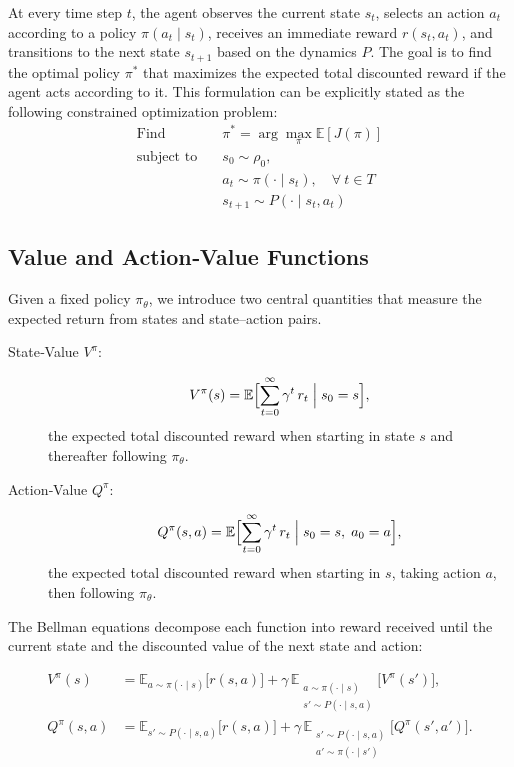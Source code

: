 At every time step \(t\), the agent observes the current state \(s_t\), selects an action \(a_t\) according to a policy \(\pi(a_t\mid s_t)\), receives an immediate reward \(r(s_t,a_t)\), and transitions to the next state \(s_{t+1}\) based on the dynamics \(P\). The goal is to find the optimal policy \(\pi^*\) that maximizes the expected total discounted reward if the agent acts according to it. This formulation can be explicitly stated as the following constrained optimization problem:
\begin{equation}\label{eq:RL_opt}
\begin{aligned}
\text{Find} \quad & \pi^* = \arg\max_{\pi} \mathbb{E}\left[J(\pi)\right] \\
\text{subject to} \quad & s_0 \sim \rho_0, \\
& a_t \sim \pi(\cdot \mid s_t), \quad \forall\ t \in T \\
& s_{t+1} \sim P(\cdot \mid s_t, a_t)
\end{aligned}
\end{equation}

\subsection{Value and Action‐Value Functions}

Given a fixed policy \(\pi_\theta\), we introduce two central quantities that measure the expected return from states and state–action pairs.

\begin{description}
  \item[State‐Value \(V^\pi\):]
    \[
      V^\pi(s)
      = \mathbb{E}\Bigl[\sum_{t=0}^{\infty}\gamma^t\,r_t
      \;\Big|\;s_0 = s\Bigr],
    \]
    the expected total discounted reward when starting in state \(s\) and thereafter following \(\pi_\theta\).
  
  \item[Action‐Value \(Q^\pi\):]
    \[
      Q^\pi(s,a)
      = \mathbb{E}\Bigl[\sum_{t=0}^{\infty}\gamma^t\,r_t
      \;\Big|\;s_0 = s,\;a_0 = a\Bigr],
    \]
    the expected total discounted reward when starting in \(s\), taking action \(a\), then following \(\pi_\theta\).
\end{description}

The Bellman equations decompose each function into reward received until the current state and the discounted value of the next state and action:

\begin{align}
\label{eq:BellmanV}
V^\pi(s)
&= \mathbb{E}_{a\sim\pi(\cdot\mid s)}\bigl[r(s,a)\bigr]
  + \gamma\,\mathbb{E}_{\substack{a\sim\pi(\cdot\mid s)\\s'\sim P(\cdot\mid s,a)}}\bigl[V^\pi(s')\bigr],\\[4pt]
\label{eq:BellmanQ}
Q^\pi(s,a)
&= \mathbb{E}_{s'\sim P(\cdot\mid s,a)}\bigl[r(s,a)\bigr]
  + \gamma\,\mathbb{E}_{\substack{s'\sim P(\cdot\mid s,a)\\a'\sim\pi(\cdot\mid s')}}\bigl[Q^\pi(s',a')\bigr].
\end{align}

